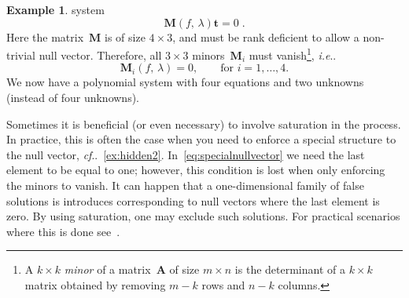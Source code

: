 \documentclass[11pt,a4paper]{article}
\makeatletter
\theoremstyle{definition}
\newtheorem{example}{Example}
\newcommand{\te}[1]{\text{#1}}
\newcommand{\mat}[1]{\bm{#1}}
\DeclareRobustCommand\ie{\emph{i.e}\@ifnextchar.{}{.\@}}
\DeclareRobustCommand\cf{\emph{cf}\@ifnextchar.{}{.\@}}
\makeatother
\begin{document}
\begin{example}
system
\begin{equation}
\mat{M}(f,\,\lambda)\mat{t} = 0\;.
\end{equation}
Here the matrix~$\mat{M}$ is of size $4\times 3$, and must be rank deficient to allow a non-trivial
null vector. Therefore, all $3\times 3$ minors~$\mat{M}_i$ must vanish\footnote{A
$k\times k$ \emph{minor} of a matrix~$\mat{A}$ of size $m\times n$ is the determinant of a $k\times k$ matrix obtained by removing $m-k$ rows and $n-k$ columns.}, \ie{}
\begin{equation}\label{eq:minors}
    \mat{M}_i(f,\,\lambda) = 0,  \qquad \te{for }i=1,\ldots, 4.
\end{equation}
We now have a polynomial system with four equations and two unknowns (instead of four unknowns).
\end{example}

Sometimes it is beneficial (or even necessary) to involve saturation in the process.
In practice, this is often the case when you need to enforce a special structure to the
null vector, \cf{}~\cref{ex:hidden2}. In~\cref{eq:specialnullvector} we need the last
element to be equal to one; however, this condition is lost when only enforcing the minors
to vanish. It can happen that a one-dimensional family of false solutions is introduces corresponding
to null vectors where the last element is zero.
By using saturation, one may exclude such solutions. For practical scenarios where this is done
see~\cite{pritts2017,valtonenoernhag-etal-wacv-2021}.
\end{document}
